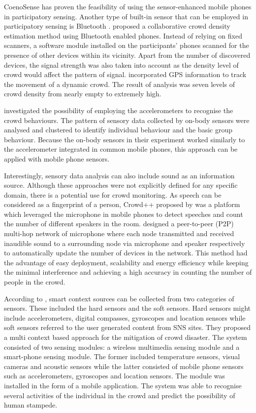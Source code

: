 CoenoSense has proven the feasibility of using the sensor-enhanced mobile phones in participatory sensing. Another type of built-in sensor that can be employed in participatory sensing is Bluetooth \citep{Stopczynski2013,Weppner2011,Weppner2013}. \citet{Weppner2011} proposed a collaborative crowd density estimation method using Bluetooth enabled phones. Instead of relying on fixed scanners, a software module installed on the participants’ phones scanned for the presence of other devices within its vicinity. Apart from the number of discovered devices, the signal strength was also taken into account as the density level of crowd would affect the pattern of signal. \citet{Weppner2013} incorporated GPS information to track the movement of a dynamic crowd. The result of analysis was seven levels of crowd density from nearly empty to extremely high.

\citet{Roggen2011} investigated the possibility of employing the accelerometers to recognise the crowd behaviours. The pattern of sensory data collected by on-body sensors were analysed and clustered to identify individual behaviour and the basic group behaviour. Because the on-body sensors in their experiment worked similarly to the accelerometer integrated in common mobile phones, this approach can be applied with mobile phone sensors.

Interestingly, sensory data analysis can also include sound as an information source. Although these approaches were not explicitly defined for any specific domain, there is a potential use for crowd monitoring. As speech can be considered as a fingerprint of a person, Crowd++ proposed by \citet{Xu2013} was a platform which leveraged the microphone in mobile phones to detect speeches and count the number of different speakers in the room. \citet{Kannan2012} designed a peer-to-peer (P2P) multi-hop network of microphone where each node transmitted and received inaudible sound to a surrounding node via microphone and speaker respectively to automatically update the number of devices in the network. This method had the advantage of easy deployment, scalability and energy efficiency while keeping the minimal interference and achieving a high accuracy in counting the number of people in the crowd.

According to \citet{Ramesh2014}, smart context sources can be collected from two categories of sensors. These included the hard sensors and the soft sensors. Hard sensors might include accelerometers, digital compasses, gyroscopes and location sensors while soft sensors referred to the user generated content from SNS sites. They proposed a multi context based approach for the mitigation of crowd disaster. The system consisted of two sensing modules: a wireless multimedia sensing module and a smart-phone sensing module. The former included temperature sensors, visual cameras and acoustic sensors while the latter consisted of mobile phone sensors such as accelerometers, gyroscopes and location sensors. The module was installed in the form of a mobile application. The system was able to recognise several activities of the individual in the crowd and predict the possibility of human stampede.

